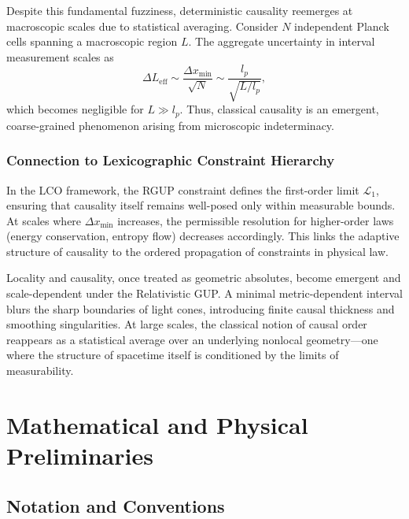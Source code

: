 \documentclass[11pt,oneside]{book}
\newenvironment{booknote}{
  \begin{tcolorbox}[
    colback=gray!3!white,
    colframe=gray!45!black,
    fonttitle=\bfseries,
    title=\textbf{Book Note},
  ]
}{\end{tcolorbox}}
\numberwithin{equation}{chapter}
\newcommand{\lp}{\ell_p}             %
\newcommand{\mpx}{m_p}               %
\newcommand{\betaz}{\beta_0}
\begin{document}
Despite this fundamental fuzziness, deterministic causality reemerges at macroscopic scales due to statistical averaging.  
Consider $N$ independent Planck cells spanning a macroscopic region \(L\).  
The aggregate uncertainty in interval measurement scales as
\begin{equation}
\Delta L_{\text{eff}} \sim \frac{\Delta x_{\min}}{\sqrt{N}}
\sim \frac{l_p}{\sqrt{L/l_p}},
\end{equation}
which becomes negligible for \( L \gg l_p \).  
Thus, classical causality is an emergent, coarse-grained phenomenon arising from microscopic indeterminacy.

\subsection*{Connection to Lexicographic Constraint Hierarchy}

In the LCO framework, the RGUP constraint defines the first-order limit $\mathcal{L}_1$, ensuring that causality itself remains well-posed only within measurable bounds.  
At scales where $\Delta x_{\min}$ increases, the permissible resolution for higher-order laws (energy conservation, entropy flow) decreases accordingly.  
This links the adaptive structure of causality to the ordered propagation of constraints in physical law.
\vspace{0.8em}

\begin{booknote}
Locality and causality, once treated as geometric absolutes, become emergent and scale-dependent under the Relativistic GUP.  
A minimal metric-dependent interval blurs the sharp boundaries of light cones, introducing finite causal thickness and smoothing singularities.  
At large scales, the classical notion of causal order reappears as a statistical average over an underlying nonlocal geometry—one where the structure of spacetime itself is conditioned by the limits of measurability.
\end{booknote}


\chapter{Mathematical and Physical Preliminaries}
\section{Notation and Conventions}
\end{document}
